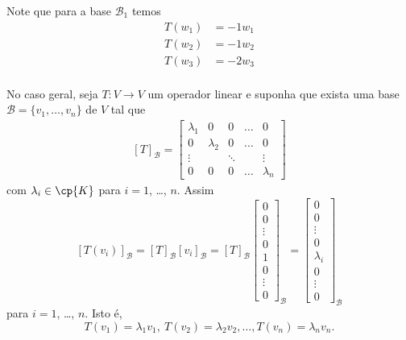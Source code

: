 Note que para a base $\mathcal{B}_1$ temos
\begin{align*}
    T(w_1) &= -1w_1\\
    T(w_2) &= -1w_2\\
    T(w_3) &= -2w_3\\
\end{align*}

No caso geral, seja $T : V \to V$ um operador linear e suponha que exista uma base $\mathcal{B} = \{v_1,\dots,v_n\}$ de $V$ tal que
\begin{align}\label{formadiagonal}
    [T]_\mathcal{B} = \begin{bmatrix}
        \lambda_1 & 0 & 0 & \dots & 0\\
        0 & \lambda_2 & 0 & \dots & 0\\
        \vdots & & \ddots & & \vdots\\
        0 & 0 & 0 & \dots & \lambda_n
    \end{bmatrix}
\end{align}
com $\lambda_i \in \cp{K}$ para $i = 1$, \dots, $n$. Assim
\[
    [T(v_i)]_\mathcal{B} = [T]_\mathcal{B}[v_i]_\mathcal{B} = [T]_\mathcal{B}\begin{bmatrix}
        0\\
        0\\
        \vdots\\
        0\\
        1\\
        0\\
        \vdots\\
        0
    \end{bmatrix}_\mathcal{B} = \begin{bmatrix}
        0\\
        0\\
        \vdots\\
        0\\
        \lambda_i\\
        0\\
        \vdots\\
        0
    \end{bmatrix}_\mathcal{B}
\]
para $i = 1$, \dots, $n$. Isto é,
\[
    T(v_1) = \lambda_1 v_1,\ T(v_2) = \lambda_2 v_2,\dots, T(v_n) = \lambda_n v_n.
\]

